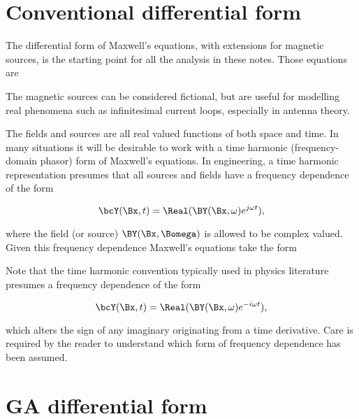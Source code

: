 %
%
\section{Conventional differential form}

The differential form of Maxwell's equations, with extensions for magnetic sources, is the starting point for all the analysis in these notes.  Those equations are



The magnetic sources can be considered fictional, but are useful for modelling real phenomena such as infinitesimal current loops, especially in antenna theory.



The fields and sources are all real valued functions of both space and time.  In many situations it will be desirable to work with a time harmonic (frequency-domain phasor) form of Maxwell's equations.  In engineering, a time harmonic representation presumes that all sources and fields have a frequency dependence of the form

\begin{dmath}\label{eqn:maxwellsEquations:20}
\bcY(\Bx, t) = \Real( \BY(\Bx, \omega) e^{j\omega t} ),
\end{dmath}

where the field (or source) \( \BY(\Bx, \Bomega) \) is allowed to be complex valued.  Given this frequency dependence Maxwell's equations take the form



Note that the time harmonic convention typically used in physics literature presumes a frequency dependence of the form

\begin{dmath}\label{eqn:maxwellsEquations:40}
\bcY(\Bx, t) = \Real( \BY(\Bx, \omega) e^{-i\omega t} ),
\end{dmath}

which alters the sign of any imaginary originating from a time derivative.  Care is required by the reader to understand which form of frequency dependence has been assumed.

\section{GA differential form}

